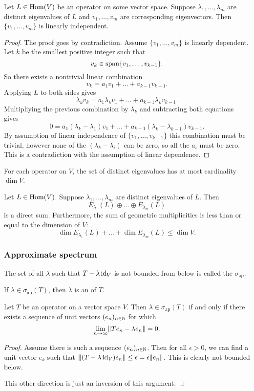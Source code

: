 \begin{proposition}
Let $L\in\operatorname{Hom}(V)$ be an operator on some vector space. Suppose $\lambda_1, \ldots, \lambda_m$ are distinct eigenvalues of $L$ and $v_1,\ldots, v_m$ are corresponding eigenvectors. Then $\{v_1,\ldots, v_m\}$ is linearly independent.
\end{proposition}
\begin{proof}
The proof goes by contradiction. Assume $\{v_1,\ldots, v_m\}$ is linearly dependent. Let $k$ be the smallest positive integer such that
\[ v_k \in \operatorname{span}\{v_1,\ldots, v_{k-1}\}. \]
So there exists a nontrivial linear combination
\[ v_k = a_1v_1+\ldots +a_{k-1}v_{k-1}. \]
Applying $L$ to both sides gives
\[ \lambda_kv_k = a_1\lambda_kv_1+\ldots +a_{k-1}\lambda_kv_{k-1}. \]
Multipliying the previous combination by $\lambda_k$ and subtracting both equations gives
\[ 0= a_1(\lambda_k-\lambda_1)v_1 +\ldots + a_{k-1}(\lambda_k - \lambda_{k-1})v_{k-1}. \]
By assumption of linear independence of $\{v_1,\ldots, v_{k-1}\}$ this combination must be trivial, however none of the $(\lambda_k-\lambda_i)$ can be zero, so all the $a_i$ must be zero. This is a contradiction with the assumption of linear dependence.
\end{proof}
\begin{corollary}
For each operator on $V$, the set of distinct eigenvalues has at most cardinality $\dim V$.
\end{corollary}
\begin{corollary}
Let $L\in\operatorname{Hom}(V)$. Suppose $\lambda_1, \ldots, \lambda_m$ are distinct eigenvalues of $L$. Then
\[ E_{\lambda_1}(L) \oplus \ldots \oplus E_{\lambda_m}(L) \]
is a direct sum. Furthermore, the sum of geometric multiplicities is less than or equal to the dimension of $V$:
\[ \dim E_{\lambda_1}(L) + \ldots + \dim E_{\lambda_m}(L) \leq \dim V. \]
\end{corollary}

\subsubsection{Approximate spectrum}
\begin{definition}
The set of all $\lambda$ such that $T-\lambda \operatorname{id}_V$ is not bounded from below is called the  $\sigma_\text{ap}$.

If $\lambda\in\sigma_\text{ap}(T)$, then $\lambda$ is an  of $T$.
\end{definition}
\begin{lemma}
Let $T$ be an operator on a vector space $V$. Then $\lambda \in \sigma_\text{ap}(T)$ \textup{if and only if} there exists a sequence of unit vectors $(e_n)_{n\in\mathbb{N}}$ for which
\[ \lim_{n\to\infty}\lVert Te_n - \lambda e_n\rVert = 0. \]
\end{lemma}
\begin{proof}
Assume there is such a sequence $(e_n)_{n\in\mathbb{N}}$. Then for all $\epsilon>0$, we can find a unit  vector $e_k$ such that $\lVert(T - \lambda \operatorname{id}_V)e_n\rVert \leq \epsilon = \epsilon \lVert e_n\rVert$. This is clearly not bounded below.

This other direction is just an inversion of this argument.
\end{proof}

